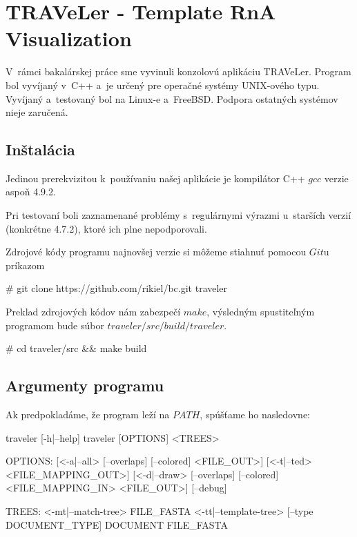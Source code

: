 
\newcommand{\paramI}[1]{\textit{-#1}}
\newcommand{\param}[1]{\textit{\--\--#1}}

\chapter{TRAVeLer - Template RnA Visualization}

V~rámci bakalárskej práce sme vyvinuli konzolovú aplikáciu TRAVeLer.
Program bol vyvíjaný v~C++ a~je určený pre operačné systémy UNIX-ového typu.
Vyvíjaný a~testovaný bol na Linux-e a~FreeBSD.
Podpora ostatných systémov nieje zaručená.





\section{Inštalácia}

Jedinou prerekvizitou k~používaniu našej aplikácie je kompilátor C++
$gcc$ verzie aspoň 4.9.2.

Pri testovaní boli zaznamenané problémy s~regulárnymi výrazmi u~starších verzií
(konkrétne 4.7.2), ktoré ich plne nepodporovali.

Zdrojové kódy programu najnovšej verzie si môžeme stiahnuť pomocou $Git$u príkazom
\begin{code}[frame=none]
# git clone https://github.com/rikiel/bc.git traveler
\end{code}

Preklad zdrojových kódov nám zabezpečí $make$, výsledným spustiteľným programom
bude súbor $traveler/src/build/traveler$.
\begin{code}[frame=none]
  # cd traveler/src && make build
\end{code}





\section{Argumenty programu}

Ak predpokladáme, že program leží na $PATH$, spúšťame ho nasledovne:

\begin{code}[frame=none]
traveler [-h|--help]
traveler [OPTIONS] <TREES>

OPTIONS:
  [<-a|--all> [--overlaps] [--colored] <FILE_OUT>]
  [<-t|--ted> <FILE_MAPPING_OUT>]
  [<-d|--draw> [--overlaps] [--colored] <FILE_MAPPING_IN> <FILE_OUT>]
  [--debug]

TREES:
  <-mt|--match-tree> FILE_FASTA
  <-tt|--template-tree> [--type DOCUMENT_TYPE] DOCUMENT FILE_FASTA
\end{code}

